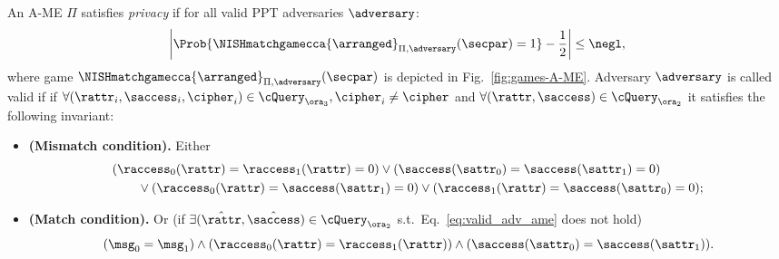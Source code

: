 \begin{definition}[Privacy of A-ME]\label{def:SNISHmatchsecurity}
    An A-ME $\Pi$ satisfies {\em privacy} if for all valid PPT adversaries $\adversary$:
    \[
        \left\lvert \Prob{\NISHmatchgamecca{\arranged}_{\Pi, \adversary}(\secpar) = 1} - \frac{1}{2} \right\rvert \leq \negl,
    \]
    where game $\NISHmatchgamecca{\arranged}_{\Pi, \adversary}(\secpar)$ is depicted in Fig.~\ref{fig:games-A-ME}.
    Adversary $\adversary$ is called valid if if $\forall (\rattr_i, \saccess_i, \cipher_i) \in \cQuery_{\ora_3}, \cipher_i \ne \cipher$ and $\forall (\rattr, \saccess) \in \cQuery_{\ora_2}$ it satisfies the following invariant:
    \begin{itemize}
        \item \textbf{(Mismatch condition).} Either
              \begin{align}
                   & (\raccess_0(\rattr) = \raccess_1(\rattr)=0) \lor (\saccess(\sattr_0) = \saccess(\sattr_1)=0) \nonumber                             \\
                   & \qquad \lor (\raccess_0(\rattr) = \saccess(\sattr_1)=0) \lor (\raccess_1(\rattr) = \saccess(\sattr_0)=0); \label{eq:valid_adv_ame}
              \end{align}
        \item \textbf{(Match condition).} Or (if $\exists(\hat\rattr, \hat\saccess) \in \cQuery_{\ora_2}$ s.t.\ Eq.~\eqref{eq:valid_adv_ame} does not hold)
              \[
                  (\msg_0 = \msg_1) \land (\raccess_0(\rattr) =\raccess_1(\rattr)) \land (\saccess(\sattr_0) = \saccess(\sattr_1)).
              \]
    \end{itemize}
\end{definition}